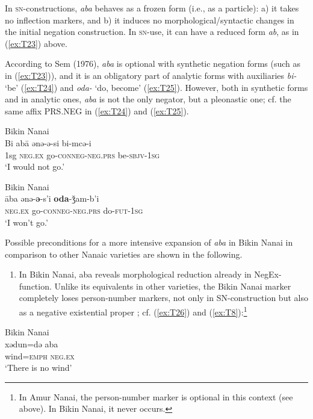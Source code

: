 \documentclass[output=paper]{langscibook}
\begin{document}
In \textsc{sn}-constructions, \textit{aba} behaves as a frozen form (i.e., as a particle): a) it takes no inflection markers, and b) it induces no morphological/syntactic changes in the initial negation construction. In \textsc{sn}-use, it can have a reduced form \textit{ab}, as in (\ref{ex:T23}) above.

According to Sem (1976), \textit{aba} is optional with synthetic negation forms (such as in (\ref{ex:T23})), and it is an obligatory part of analytic forms with auxiliaries \textit{bi-} ‘be’ (\ref{ex:T24}) and \textit{oda-} ‘do, become’ (\ref{ex:T25}). However, both in synthetic forms and in analytic ones, \textit{aba} is not the only negator, but a pleonastic one; cf. the same affix PRS.NEG in (\ref{ex:T24}) and (\ref{ex:T25}).

\ea Bikin Nanai \label{ex:T24}\\
	\gll Bi	abā	ənə-ə-si					bi-mcə-i\\
	1sg	\textsc{neg.ex}	go-\textsc{conneg-neg.prs}		be-\textsc{sbjv-1sg}\\
	\glt `I would not go.' \citep[76]{sem1976a}
\z

\ea Bikin Nanai \label{ex:T25}\\
	\gll āba	ənə-\textbf{ə}-s’i			\textbf{oda}-ǯam-b’i\\
	\textsc{neg.ex}	go-\textsc{conneg-neg.prs}	do-\textsc{fut-1sg}\\
	\glt `I won’t go.' \citep[76]{sem1976a}
\z

Possible preconditions for a more intensive expansion of \textit{aba} in Bikin Nanai in comparison to other Nanaic varieties are shown in the following.

\begin{enumerate}
    \item In Bikin Nanai, aba reveals morphological reduction already in NegEx-function. Unlike its equivalents in other varieties, the Bikin Nanai marker completely loses person-number markers, not only in SN-construction but also as a negative existential proper \citep[51]{sem1976a}; cf. (\ref{ex:T26}) and (\ref{ex:T8}):\footnote{In Amur Nanai, the person-number marker is optional in this context (see above). In Bikin Nanai, it never occurs.}
\end{enumerate}

\ea Bikin Nanai \label{ex:T26}\\
	\gll xədun=də	aba\\
	wind=\textsc{emph}	\textsc{neg.ex}\\
	\glt `There is no wind' \citep[51]{sem1976a}
\z
\end{document}
